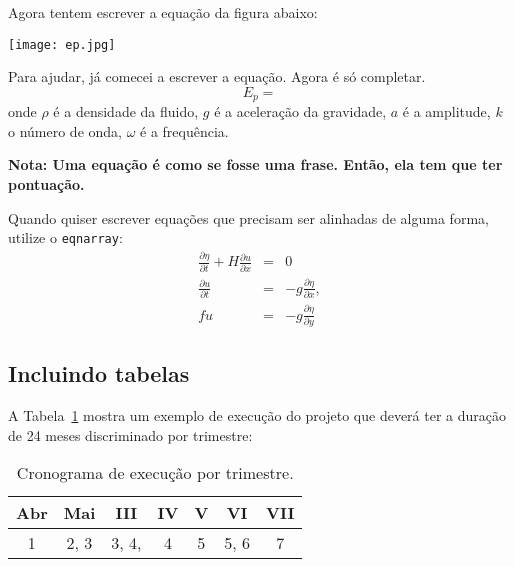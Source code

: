 \documentclass[pdftex,12pt,a4paper]{article} %
\begin{document}
Agora tentem escrever a equação da figura abaixo:

\centerline{\hbox{\texttt{[image: ep.jpg]}}}

Para ajudar, já comecei a escrever a equação. Agora é só completar.
\begin{equation}
  E_p=
\label{ep}
\end{equation}
onde $\rho$ é a densidade da fluido, $g$ é a aceleração da gravidade,
$a$ é a amplitude, $k$ o número de onda, $\omega$ é a frequência.

{\bf Nota: Uma equação é como se fosse uma frase. Então, ela tem que
  ter pontuação.}

Quando quiser escrever equações que precisam ser alinhadas de alguma
forma, utilize o \verb#eqnarray#:
\begin{eqnarray}
\frac{\partial \eta}{\partial t} + H \frac{\partial u}{\partial x}
& = & 0 \nonumber \\ 
\frac{\partial u}{\partial t} & = & -g \frac{\partial
  \eta}{\partial x},   
\label{swater_kelvin} \\
fu & = & -g \frac{\partial \eta}{\partial y}  \nonumber 
\end{eqnarray}

\subsection{Incluindo tabelas}


A Tabela~\ref{crono} mostra um exemplo de execução do projeto que
deverá ter a duração de 24 meses discriminado por trimestre:
\begin{table}[ht]
  \begin{center}
\caption{Cronograma de execução por trimestre.}
\begin{tabular}{ccccccc} \hline \hline
 Abr & Mai & III & IV & V & VI & VII \\ \hline
 1  & 2, 3 &  3, 4,  &   4     &   5 &  5, 6 & 7 \\ \hline
\end{tabular}
\label{crono}
  \end{center}
\end{table}
\end{document}
